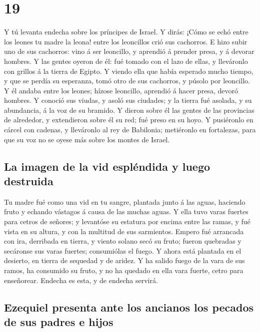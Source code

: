 \hypertarget{section-18}{%
\section{19}\label{section-18}}

 Y tú levanta endecha sobre los príncipes de Israel.
 Y dirás: ¡Cómo se echó entre los leones tu madre la
leona! entre los leoncillos crió sus cachorros.  E hizo
subir uno de sus cachorros: vino á ser leoncillo, y aprendió á prender
presa, y á devorar hombres.  Y las gentes oyeron de él:
fué tomado con el lazo de ellas, y lleváronlo con grillos á la tierra de
Egipto.  Y viendo ella que había esperado mucho tiempo, y
que se perdía su esperanza, tomó otro de sus cachorros, y púsolo por
leoncillo.  Y él andaba entre los leones; hízose
leoncillo, aprendió á hacer presa, devoró hombres.  Y
conoció sus viudas, y asoló sus ciudades; y la tierra fué asolada, y su
abundancia, á la voz de su bramido.  Y dieron sobre él las
gentes de las provincias de alrededor, y extendieron sobre él su red;
fué preso en su hoyo.  Y pusiéronlo en cárcel con cadenas,
y lleváronlo al rey de Babilonia; metiéronlo en fortalezas, para que su
voz no se oyese más sobre los montes de Israel.

\hypertarget{la-imagen-de-la-vid-espluxe9ndida-y-luego-destruida}{%
\subsection{La imagen de la vid espléndida y luego
destruida}\label{la-imagen-de-la-vid-espluxe9ndida-y-luego-destruida}}

 Tu madre fué como una vid en tu sangre, plantada junto á
las aguas, haciendo fruto y echando vástagos á causa de las muchas
aguas.  Y ella tuvo varas fuertes para cetros de señores;
y levantóse su estatura por encima entre las ramas, y fué vista en su
altura, y con la multitud de sus sarmientos.  Empero fué
arrancada con ira, derribada en tierra, y viento solano secó su fruto;
fueron quebradas y secáronse sus varas fuertes; consumiólas el fuego.
 Y ahora está plantada en el desierto, en tierra de
sequedad y de aridez.  Y ha salido fuego de la vara de
sus ramos, ha consumido su fruto, y no ha quedado en ella vara fuerte,
cetro para enseñorear. Endecha es esta, y de endecha servirá.

\hypertarget{ezequiel-presenta-ante-los-ancianos-los-pecados-de-sus-padres-e-hijos}{%
\subsection{Ezequiel presenta ante los ancianos los pecados de sus
padres e
hijos}\label{ezequiel-presenta-ante-los-ancianos-los-pecados-de-sus-padres-e-hijos}}

